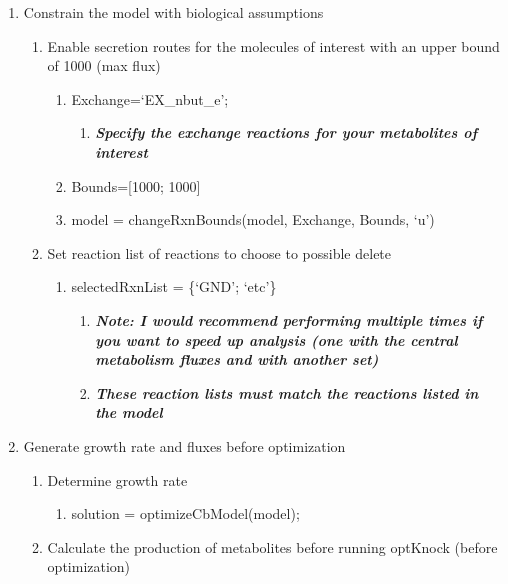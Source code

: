 \begin{enumerate} [noitemsep,topsep=0pt]
    \item Constrain the model with biological assumptions
    \begin{enumerate}[noitemsep,topsep=0pt]
        \item Enable secretion routes for the molecules of interest with an upper bound of 1000 (max flux)
        \begin{enumerate}[noitemsep,topsep=0pt]
            \item Exchange={‘EX\_nbut\_e’};
            \begin{enumerate}[noitemsep,topsep=0pt]
                \item \textbf{\textit{Specify the exchange reactions for your metabolites of interest}}
                \end{enumerate}
            \item Bounds=[1000; 1000]
            \item model = changeRxnBounds(model, Exchange, Bounds, ‘u’)
        \end{enumerate}
        \item Set reaction list of reactions to choose to possible delete
        \begin{enumerate}[noitemsep,topsep=0pt]
\item selectedRxnList = \{‘GND’; ‘etc’\}
\begin{enumerate}[noitemsep,topsep=0pt]
    \item \textbf{\textit{Note: I would recommend performing multiple times if you want to speed up analysis (one with the central metabolism fluxes and with another set)}}
    \item \textbf{\textit{These reaction lists must match the reactions listed in the model }}
\end{enumerate}
\end{enumerate}
    \end{enumerate}
\item Generate growth rate and fluxes before optimization
\begin{enumerate}[noitemsep,topsep=0pt]
\item Determine growth rate
\begin{enumerate}[noitemsep,topsep=0pt]
    \item solution = optimizeCbModel(model);
\end{enumerate}
\item Calculate the production of metabolites before running optKnock (before optimization)

\end{enumerate}
\end{enumerate}
